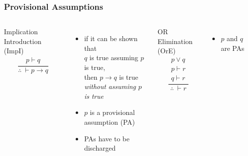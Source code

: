 \documentclass[dvipsnames]{beamer}
\begin{document}
\begin{frame}
  \frametitle{Provisional Assumptions}

  \begin{columns}[t]
    \begin{block}{Implication Introduction (ImpI)}
      \[
      \frac
        {
          \begin{array}{c}
            p \vdash q
          \end{array}
        }
        {
          \therefore ~ \vdash p \rightarrow q
        }
      \]
    \end{block}

    \begin{itemize}
      \item if it can be shown that\\
        $q$ is true assuming $p$ is true,\\
        then $p \rightarrow q$ is true\\
        \emph{without assuming $p$ is true}

      \pause
      \medskip
      \item $p$ is a \alert{provisional assumption} (PA)
      \item PAs have to be \alert{discharged}
    \end{itemize}

    \pause
    \begin{block}{OR Elimination (OrE)}
      \[
      \frac
        {
          \begin{array}{c}
            p \vee q\\
            p \vdash r\\
            q \vdash r
          \end{array}
        }
        {
          \therefore ~ \vdash r
        }
      \]
    \end{block}

    \begin{itemize}
      \item $p$ and $q$ are PAs
    \end{itemize}
  \end{columns}
\end{frame}
\end{document}
